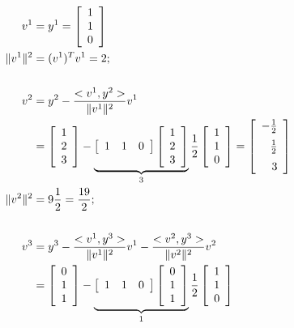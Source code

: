 \documentclass[11pt,twoside]{nsf_jwg}
\begin{document}
	\begin{align*}
		v^1 &= y^1 = \left[ \begin{array}{c} 1 \\ 1 \\ 0 \end{array} \right]\\
		\quad \| v^1 \|^2 &= (v^1)^T v^1 = 2 ;\\
		\\
		v^2	&= y^2 - \frac{<v^1,y^2>}{\| v^1 \|^2} v^1 \\
		&= \left[ \begin{array}{c} 1 \\ 2 \\ 3 \end{array} \right]
		- \underbrace{%
		   \left[ \begin{array}{ccc} 1 & 1 & 0 \end{array} \right]
		   \left[ \begin{array}{c} 1 \\ 2 \\ 3 \end{array} \right]%
		   }_{3}
		\frac{1}{2}
		   \left[ \begin{array}{c} 1 \\ 1 \\ 0 \end{array} \right]
		= \left[ \begin{array}{r}
			- \frac{1}{2} \medskip \\ \frac{1}{2} \medskip \\ 3
			\end{array} \right] \\
		\| v^2 \|^2 &= 9 \frac{1}{2} = \frac{19}{2} ;\\
		\\
		v^3	&= y^3 - \frac{<v^1,y^3>}{\| v^1 \|^2} v^1
			- \frac{<v^2,y^3>}{\| v^2 \|^2} v^2 \\
		&= \left[ \begin{array}{c} 0 \\ 1 \\ 1 \end{array} \right]
		- \underbrace{%
		   \left[ \begin{array}{ccc} 1 & 1 & 0 \end{array} \right]
		   \left[ \begin{array}{c} 0 \\ 1 \\ 1 \end{array} \right]%
		   }_{1}
		\frac{1}{2}
		   \left[ \begin{array}{c} 1 \\ 1 \\ 0 \end{array} \right]

\end{align*}
\end{document}
